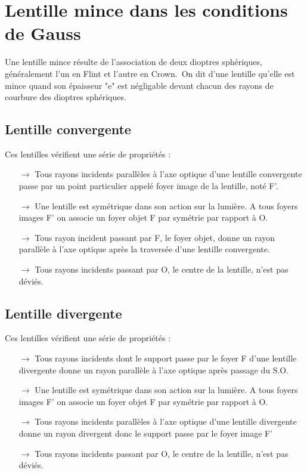 \section{Lentille mince dans les conditions de Gauss}
Une lentille mince résulte de l'association de deux dioptres sphériques, généralement l'un en Flint et l'autre en Crown.\
On dit d'une lentille qu'elle est mince quand son épaisseur "e" est négligable devant chacun des rayons de courbure des dioptres sphériques.\
\subsection{Lentille convergente}
Ces lentilles vérifient une série de propriétés : 
\begin{itemize}
 \item[$\rightarrow$] Tous rayons incidents parallèles à l'axe optique d'une lentille convergente passe par un point particulier appelé foyer image de la lentille, noté F'.
 \item[$\rightarrow$] Une lentille est symétrique dans son action sur la lumière. A tous foyers images F' on associe un foyer objet F par symétrie par rapport à O.
 \item[$\rightarrow$] Tous rayon incident passant par F, le foyer objet, donne un rayon parallèle à l'axe optique après la traversée d'une lentille convergente.
 \item[$\rightarrow$] Tous rayons incidents passant par O, le centre de la lentille, n'est pas déviés.
\end{itemize}
\subsection{Lentille divergente}
Ces lentilles vérifient une série de propriétés : 
\begin{itemize}
  \item[$\rightarrow$] Tous rayons incidents dont le support passe par le foyer F d'une lentille divergente donne un rayon parallèle à l'axe optique après passage du S.O.
 \item[$\rightarrow$] Une lentille est symétrique dans son action sur la lumière. A tous foyers images F' on associe un foyer objet F par symétrie par rapport à O.
  \item[$\rightarrow$] Tous rayons incidents parallèles à l'axe optique d'une lentille divergente donne un rayon divergent donc le support passe par le foyer image F'
 \item[$\rightarrow$] Tous rayons incidents passant par O, le centre de la lentille, n'est pas déviés.
\end{itemize}
